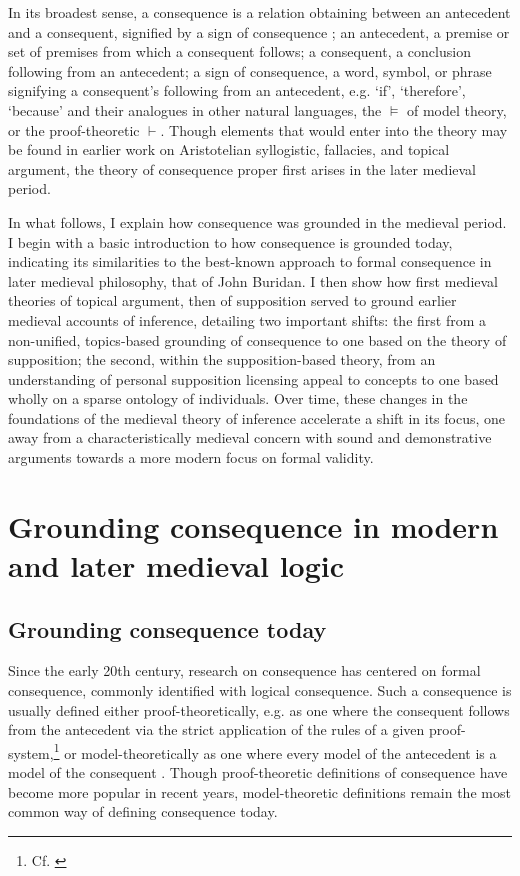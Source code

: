 \documentclass[a4paper, 11pt]{article}
\begin{document}
In its broadest sense, a consequence is a relation obtaining between an antecedent and a consequent, signified by a sign of consequence \autocite{StrodeConsequentiis,Green-Pedersen1980a}; an antecedent, a premise or set of premises from which a consequent follows; a consequent, a conclusion following from an antecedent; a sign of consequence, a word, symbol, or phrase signifying a consequent's following from an antecedent, e.g. `if', `therefore', `because' and their analogues in other natural languages, the $\vDash$ of model theory, or the proof-theoretic $\vdash$. Though elements that would enter into the theory may be found in earlier work on Aristotelian syllogistic, fallacies, and topical argument, the theory of consequence proper first arises in the later medieval period. 

In what follows, I explain how consequence was grounded in the medieval period. I begin with a basic introduction to how consequence is grounded today, indicating its similarities to the best-known approach to formal consequence in later medieval philosophy, that of John Buridan. I then show how first medieval theories of topical argument, then of supposition served to ground earlier medieval accounts of inference, detailing two important shifts: the first from a non-unified, topics-based grounding of consequence to one based on the theory of supposition; the second, within the supposition-based theory, from an understanding of personal supposition licensing appeal to concepts to one based wholly on a sparse ontology of individuals. Over time, these changes in the foundations of the medieval theory of inference accelerate a shift in its focus, one away from a characteristically medieval concern with sound and demonstrative arguments towards a more modern focus on formal validity.

\section{Grounding consequence in modern and later medieval logic}
\subsection{Grounding consequence today}
Since the early 20th century, research on consequence has centered on formal consequence, commonly identified with logical consequence. Such a consequence is usually defined either proof-theoretically, e.g. as one where the consequent follows from the antecedent via the strict application of the rules of a given proof-system,\footnote{Cf. \autocite{Prawitz1985,Schroeder-Heister2006,Hjortland2009,Franks2010}} or model-theoretically as one where every model of the antecedent is a model of the consequent \autocite{Tarski2002,Gomez-Torrente2000}. Though proof-theoretic definitions of consequence have become more popular in recent years, model-theoretic definitions remain the most common way of defining consequence today.
\end{document}
